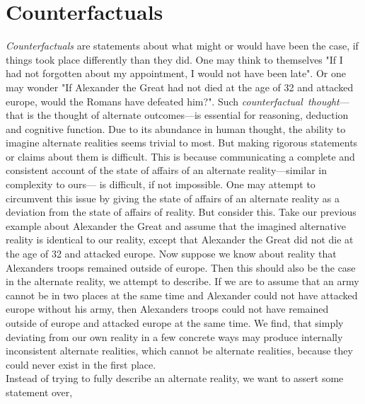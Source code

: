 \documentclass[a4paper,american]{paper}
\theoremstyle{definition}\newtheorem{definition}{Definition}
\begin{document}
\section{Counterfactuals}
\textit{Counterfactuals} are statements about what might or would have been the case, if things took place differently than they did. One may think to themselves "If I had not forgotten about my appointment, I would not have been late". Or one may wonder "If Alexander the Great had not died at the age of 32 and attacked europe, would the Romans have defeated him?". Such \textit{counterfactual~thought}---that is the thought of alternate outcomes---is essential for reasoning, deduction and cognitive function. \cite{byrne_counterfactual_2016} Due to its abundance in human thought, the ability to imagine alternate realities seems trivial to most. But making rigorous statements or claims about them is difficult. This is because communicating a complete and consistent account of the state of affairs of an alternate reality---similar in complexity to ours--- is difficult, if not impossible. One may attempt to circumvent this issue by giving the state of affairs of an alternate reality as a deviation from the state of affairs of reality. But consider this. 
Take our previous example about Alexander the Great and assume that the imagined alternative reality is identical to our reality, except that Alexander the Great did not die at the age of 32 and attacked europe. Now suppose we know about reality that Alexanders troops remained outside of europe. Then this should also be the case in the alternate reality, we attempt to describe. If we are to assume that an army cannot be in two places at the same time and Alexander could not have attacked europe without his army, then Alexanders troops could not have remained outside of europe and attacked europe at the same time.
We find, that simply deviating from our own reality in a few concrete ways may produce internally inconsistent alternate realities, which cannot be alternate realities, because they could never exist in the first place.\\
Instead of trying to fully describe an alternate reality, we want to assert some statement over, 
\end{document}
